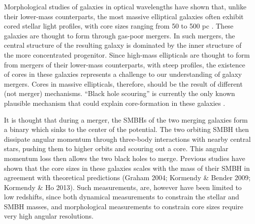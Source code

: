 \documentclass[chicago]{emulateapj}
\begin{document}
Morphological studies of galaxies in optical wavelengths have shown that, unlike their lower-mass counterparts, the most massive elliptical galaxies often exhibit cored stellar light profiles, with core sizes ranging from 50 to 500 pc \citep{e.g.ferrarese06}. 
These galaxies are thought to form through gas-poor mergers. In such mergers, the central structure of the resulting galaxy is dominated by the inner structure of the more concentrated progenitor.  Since high-mass ellipticals are thought to form from mergers of their lower-mass counterparts, with steep profiles, the existence of cores in these galaxies represents a challenge to our understanding of galaxy mergers. Cores in massive ellipticals, therefore, should be the result of different (not merger) mechanisms.  
``Black hole scouring'' is currently the only known plausible mechanism that could explain core-formation in these galaxies \citep{Thomas2014}.

It is thought that during a merger, the SMBHs of the two merging galaxies form a binary which sinks to the center of the potential. The two orbiting SMBH then dissipate angular momentum through three-body interactions with nearby central stars, pushing them to higher orbits and scouring out a core. This angular momentum loss then allows the two black holes to merge. \citep{Begelman et al. 1980}
Previous studies have shown that the core sizes in these galaxies scales with the mass of their SMBH in agreement with theoretical predictions (Graham 2004; Kormendy \& Bender 2009; Kormendy \& Ho 2013).
Such measurements, are, however have been limited to low redshifts, since both dynamical measurements to constrain the stellar and SMBH masses, and morphological measurements to constrain core sizes require very high angular resolutions. 
\end{document}

